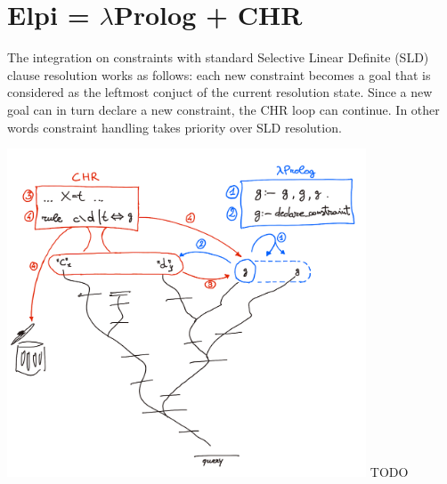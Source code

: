 \documentclass[a4paper, 11pt]{book}
\begin{document}




\section{Elpi = $\lambda$Prolog + CHR}\label{sec:elpiLP+CHR}

The integration on constraints with standard
Selective Linear Definite (SLD) clause resolution works as follows:
each new constraint becomes
a goal that is considered as the leftmost conjuct of the current
resolution state. Since a new goal can in turn declare a new constraint,
the CHR loop can continue. In other words constraint handling takes
priority over SLD resolution.


  \includegraphics[width=0.8\textwidth]{chr.png}
TODO
\end{document}
